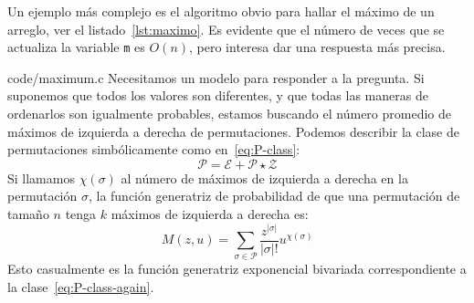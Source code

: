   Un ejemplo más complejo es el algoritmo obvio
  para hallar el máximo de un arreglo,%
  ver el listado~\ref{lst:maximo}.
  Es evidente que el número de veces que se actualiza la variable
  \lstinline!m! es \(O(n)\),
  pero interesa dar una respuesta más precisa.
  
		   {code/maximum.c}
  Necesitamos un modelo para responder a la pregunta.
  Si suponemos que todos los valores son diferentes,
  y que todas las maneras de ordenarlos son igualmente probables,
  estamos buscando el número promedio de máximos de izquierda a derecha
  de permutaciones.%
  Podemos describir la clase de permutaciones simbólicamente
  como en~\eqref{eq:P-class}:
  \begin{equation}
    \label{eq:P-class-again}
    \mathcal{P}
      = \mathcal{E} + \mathcal{P} \star \mathcal{Z}
  \end{equation}
  Si llamamos \(\chi(\sigma)\) al número de máximos de izquierda a derecha
  en la permutación \(\sigma\),
  la función generatriz de probabilidad de que una permutación de tamaño \(n\)
  tenga \(k\) máximos de izquierda a derecha es:
  \begin{equation}
    \label{eq:M-pgf}
    M(z, u)
      = \sum_{\sigma \in \mathcal{P}}
	  \frac{z^{\lvert \sigma \rvert}}{\lvert \sigma \rvert !}
	    u^{\chi(\sigma)}
  \end{equation}
  Esto casualmente es la función generatriz exponencial bivariada
  correspondiente a la clase~\eqref{eq:P-class-again}.

